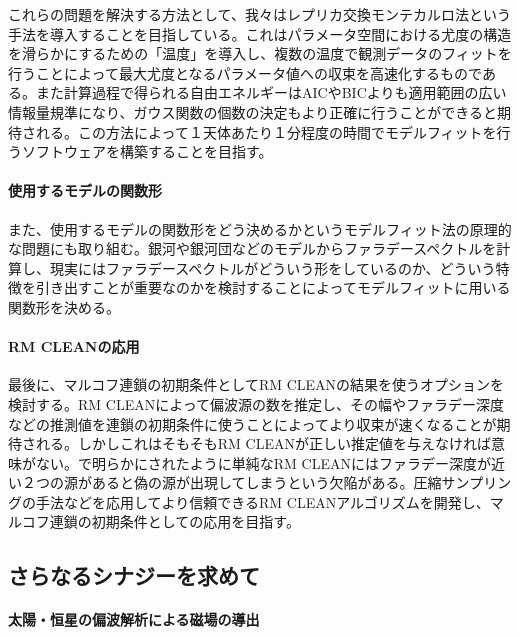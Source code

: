 これらの問題を解決する方法として、我々はレプリカ交換モンテカルロ法という手法を導入することを目指している。これはパラメータ空間における尤度の構造を滑らかにするための「温度」を導入し、複数の温度で観測データのフィットを行うことによって最大尤度となるパラメータ値への収束を高速化するものである。また計算過程で得られる自由エネルギーはAICやBICよりも適用範囲の広い情報量規準になり、ガウス関数の個数の決定もより正確に行うことができると期待される。この方法によって１天体あたり１分程度の時間でモデルフィットを行うソフトウェアを構築することを目指す。

\paragraph{使用するモデルの関数形}

また、使用するモデルの関数形をどう決めるかというモデルフィット法の原理的な問題にも取り組む。銀河や銀河団などのモデルからファラデースペクトルを計算し、現実にはファラデースペクトルがどういう形をしているのか、どういう特徴を引き出すことが重要なのかを検討することによってモデルフィットに用いる関数形を決める。

\paragraph{RM CLEANの応用}

最後に、マルコフ連鎖の初期条件としてRM CLEANの結果を使うオプションを検討する。RM CLEANによって偏波源の数を推定し、その幅やファラデー深度などの推測値を連鎖の初期条件に使うことによってより収束が速くなることが期待される。しかしこれはそもそもRM CLEANが正しい推定値を与えなければ意味がない。\cite{2014PASJ...66...61K}で明らかにされたように単純なRM CLEANにはファラデー深度が近い２つの源があると偽の源が出現してしまうという欠陥がある。圧縮サンプリングの手法などを応用してより信頼できるRM CLEANアルゴリズムを開発し、マルコフ連鎖の初期条件としての応用を目指す。


\subsection{さらなるシナジーを求めて}
\label{c06.s3.ss13}

\paragraph{太陽・恒星の偏波解析による磁場の導出}

